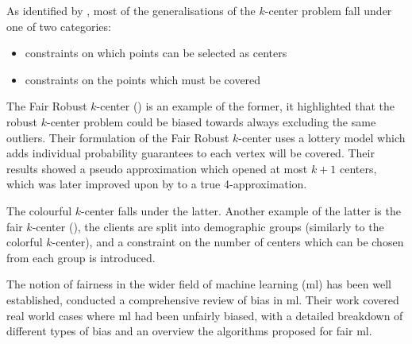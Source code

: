 As identified by \textcite{anegg_technique_2020}, most of the generalisations of the $k$-center problem fall under one of two categories:
\begin{itemize}
    \item constraints on which points can be selected as centers
    \item constraints on the points which must be covered
\end{itemize}
 The Fair Robust $k$-center (\cite{harris_lottery_2017}) is an example of the former, it highlighted that the robust $k$-center problem could be biased towards always excluding the same outliers. Their formulation of the Fair Robust $k$-center uses a lottery model which adds individual probability guarantees to each vertex will be covered. Their results showed a pseudo approximation which opened at most $k+1$ centers, which was later improved upon by \citeauthor{anegg_technique_2020} to a true 4-approximation.

The colourful $k$-center falls under the latter. Another example of the latter is the fair $k$-center (\cite{kleindessner_fair_2019}), the clients are split into demographic groups (similarly to the colorful $k$-center), and a constraint on the number of centers which can be chosen from each group is introduced.

The notion of fairness in the wider field of machine learning (\acrshort{ml}) has been well established, \textcite{mehrabi_survey_2019} conducted a comprehensive review of bias in \acrshort{ml}. Their work covered real world cases where \acrshort{ml} had been unfairly biased, with a detailed breakdown of different types of bias and an overview the algorithms proposed for fair \acrshort{ml}.
